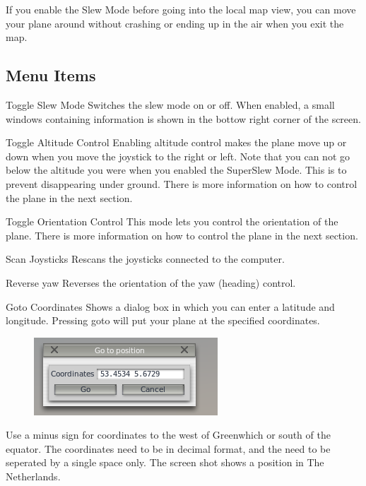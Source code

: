 \documentclass[a4paper,12pt]{article}
\newenvironment{vlist}[1]{%
\begin{list}{}{%
    \settowidth{\labelwidth}{\tt #1 }     %
    \setlength{\leftmargin}{\labelwidth}  %
    \addtolength{\leftmargin}{\labelsep}  %
    \setlength{\parsep}{0.5ex plus 0.2ex minus 0.2ex}
    \setlength{\itemsep}{0.3ex}
    \renewcommand{\makelabel}[1]{\color{headings}\tt ##1 \color{text1}\hfill}}}%
{\end{list}}
\begin{document}
If you enable the Slew Mode before going into the local map view, you
can move your plane around without crashing or ending up in the air
when you exit the map.

\subsection*{Menu Items}

\begin{vlist}{w}

\item[Toggle Slew Mode] Switches the slew mode on or
off. When enabled, a small windows containing information is shown in
the bottow right corner of the screen. 

\item[Toggle Altitude Control] Enabling altitude control makes the
  plane move up or down when you move the joystick to the right or
  left. Note that you can not go below the altitude you were when you
  enabled the SuperSlew Mode. This is to prevent disappearing under
  ground. There is more information on how to control the plane in the
  next section.

\item[Toggle Orientation Control] This mode lets you control the
  orientation of the plane. There is more information on how to
  control the plane in the next section.

\item[Scan Joysticks] Rescans the joysticks connected to the computer.

\item[Reverse yaw] Reverses the orientation of the yaw (heading) control.

\item[Goto Coordinates] Shows a dialog box in which you can enter a
  latitude and longitude. Pressing goto will put your plane at the
  specified coordinates.
\begin{figure}[h!]%
\centering
\includegraphics[scale=1]{slewgoto.png}
\label{fig:infowindow}
\end{figure}
Use a minus sign for coordinates to the west of Greenwhich or south
of the equator. The coordinates need to be in decimal format, and the need
to be seperated by a single space only. The screen shot shows a
position in The Netherlands.


\end{vlist}
\end{document}
